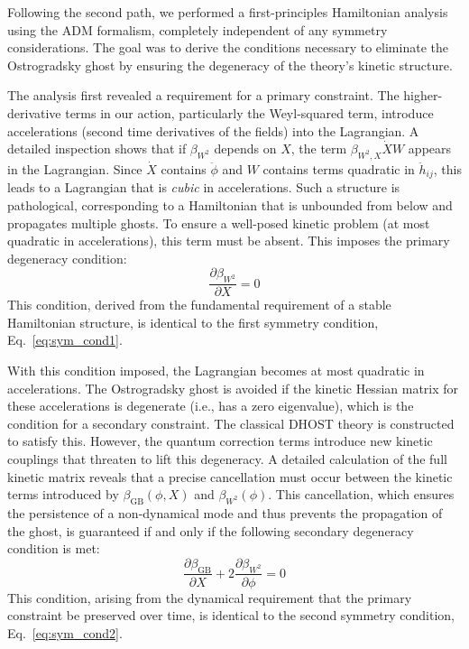 \documentclass[twocolumn]{aastex631}
\begin{document}
Following the second path, we performed a first-principles Hamiltonian analysis using the ADM formalism, completely independent of any symmetry considerations. The goal was to derive the conditions necessary to eliminate the Ostrogradsky ghost by ensuring the degeneracy of the theory's kinetic structure.

The analysis first revealed a requirement for a primary constraint. The higher-derivative terms in our action, particularly the Weyl-squared term, introduce accelerations (second time derivatives of the fields) into the Lagrangian. A detailed inspection shows that if $\beta_{W^2}$ depends on $X$, the term $\beta_{W^2,X} \dot{X} W$ appears in the Lagrangian. Since $\dot{X}$ contains $\ddot{\phi}$ and $W$ contains terms quadratic in $\ddot{h}_{ij}$, this leads to a Lagrangian that is \textit{cubic} in accelerations. Such a structure is pathological, corresponding to a Hamiltonian that is unbounded from below and propagates multiple ghosts. To ensure a well-posed kinetic problem (at most quadratic in accelerations), this term must be absent. This imposes the primary degeneracy condition:
\begin{equation}
    \frac{\partial\beta_{W^2}}{\partial X} = 0
\end{equation}
This condition, derived from the fundamental requirement of a stable Hamiltonian structure, is identical to the first symmetry condition, Eq.~\eqref{eq:sym_cond1}.

With this condition imposed, the Lagrangian becomes at most quadratic in accelerations. The Ostrogradsky ghost is avoided if the kinetic Hessian matrix for these accelerations is degenerate (i.e., has a zero eigenvalue), which is the condition for a secondary constraint. The classical DHOST theory is constructed to satisfy this. However, the quantum correction terms introduce new kinetic couplings that threaten to lift this degeneracy. A detailed calculation of the full kinetic matrix reveals that a precise cancellation must occur between the kinetic terms introduced by $\beta_{\text{GB}}(\phi,X)$ and $\beta_{W^2}(\phi)$. This cancellation, which ensures the persistence of a non-dynamical mode and thus prevents the propagation of the ghost, is guaranteed if and only if the following secondary degeneracy condition is met:
\begin{equation}
    \frac{\partial\beta_{\text{GB}}}{\partial X} + 2 \frac{\partial\beta_{W^2}}{\partial\phi} = 0
\end{equation}
This condition, arising from the dynamical requirement that the primary constraint be preserved over time, is identical to the second symmetry condition, Eq.~\eqref{eq:sym_cond2}.
\end{document}
